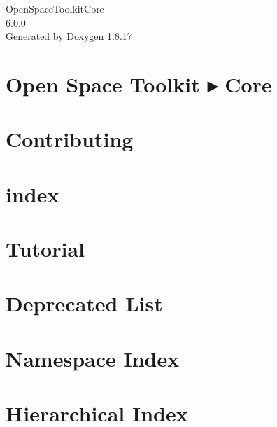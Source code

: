 \let\mypdfximage\pdfximage\def\pdfximage{\immediate\mypdfximage}\documentclass[twoside]{book}
\newcommand{\+}{\discretionary{\mbox{\scriptsize$\hookleftarrow$}}{}{}}
\newcommand{\clearemptydoublepage}{%
  \newpage{\pagestyle{empty}\cleardoublepage}%
}
\begin{document}
\hypersetup{pageanchor=false,
             bookmarksnumbered=true,
             pdfencoding=unicode
            }
\begin{titlepage}
\vspace*{7cm}
\begin{center}%
{\Large Open\+Space\+Toolkit\+Core \\[1ex]\large 6.\+0.\+0 }\\
\vspace*{1cm}
{\large Generated by Doxygen 1.8.17}\\
\end{center}
\end{titlepage}
\clearemptydoublepage
{}
\tableofcontents
\clearemptydoublepage
{}
\hypersetup{pageanchor=true}

\chapter{Open Space Toolkit ▸ Core}
\label{index}\hypertarget{index}{}
\chapter{Contributing}
\label{md__c_o_n_t_r_i_b_u_t_i_n_g}

\chapter{index}
\label{md_docs_index}

\chapter{Tutorial}
\label{md_docs__tutorial}

\chapter{Deprecated List}
\label{deprecated}

\chapter{Namespace Index}

\chapter{Hierarchical Index}

\end{document}

